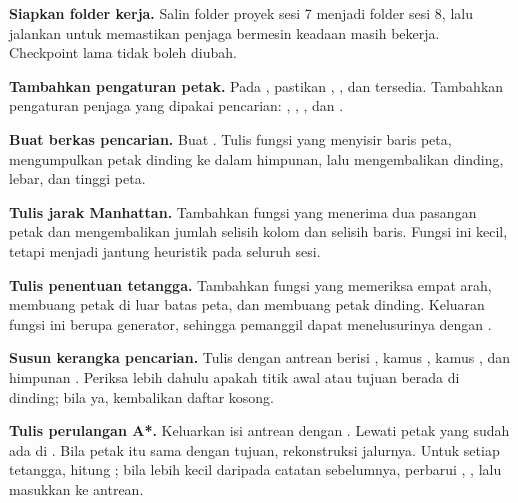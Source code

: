 \begin{langkah}
  \item \textbf{Siapkan folder kerja.} Salin folder proyek sesi 7 menjadi
        folder sesi 8, lalu jalankan  untuk
        memastikan penjaga bermesin keadaan masih bekerja. Checkpoint lama
        tidak boleh diubah.

  \item \textbf{Tambahkan pengaturan petak.} Pada ,
        pastikan , , dan
         tersedia. Tambahkan pengaturan penjaga
        yang dipakai pencarian: ,
        , ,
        dan .

  \item \textbf{Buat berkas pencarian.} Buat
        . Tulis fungsi
         yang menyisir baris peta, mengumpulkan petak
        dinding ke dalam himpunan, lalu mengembalikan dinding, lebar, dan
        tinggi peta.

  \item \textbf{Tulis jarak Manhattan.} Tambahkan fungsi 
        yang menerima dua pasangan petak dan mengembalikan jumlah selisih
        kolom dan selisih baris. Fungsi ini kecil, tetapi menjadi jantung
        heuristik pada seluruh sesi.

  \item \textbf{Tulis penentuan tetangga.} Tambahkan fungsi
         yang memeriksa empat arah, membuang petak di luar
        batas peta, dan membuang petak dinding. Keluaran fungsi ini berupa
        generator, sehingga pemanggil dapat menelusurinya dengan
        .

  \item \textbf{Susun kerangka pencarian.} Tulis  dengan
        antrean  berisi , kamus , kamus , dan himpunan
        . Periksa lebih dahulu apakah titik awal atau tujuan
        berada di dinding; bila ya, kembalikan daftar kosong.

  \item \textbf{Tulis perulangan A*.} Keluarkan isi antrean dengan
        . Lewati petak yang sudah ada di .
        Bila petak itu sama dengan tujuan, rekonstruksi jalurnya. Untuk
        setiap tetangga, hitung ; bila lebih kecil
        daripada catatan sebelumnya, perbarui ,
        , lalu masukkan 
        ke antrean.


\end{langkah}
